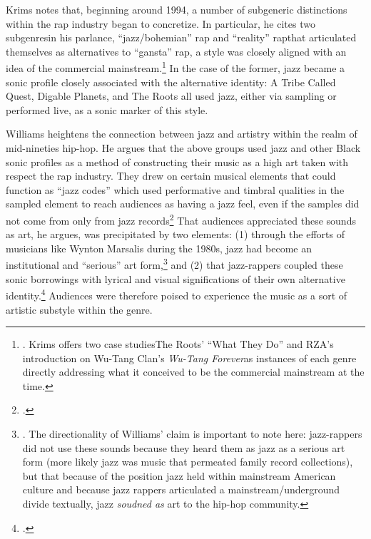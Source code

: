 Krims notes that, beginning around 1994, a number of subgeneric distinctions within the rap industry began to concretize. In
particular, he cites two subgenres\textemdash in his parlance, ``jazz/bohemian'' rap and ``reality'' rap\textemdash that 
articulated themselves as alternatives to ``gansta'' rap, a style was closely aligned with an idea of the commercial 
mainstream.\footnote{
    \autocite[64--65]{adamkrimsRapMusicPoetics2000}. Krims offers two case studies\textemdash The Roots' 
    ``What They Do'' and RZA's introduction on Wu-Tang Clan's \textit{Wu-Tang Forever}\textemdash as 
    instances of each genre directly addressing what it conceived to be the commercial mainstream at
    the time.}
In the case of the former, jazz became a sonic profile closely associated with the alternative identity: A Tribe Called 
Quest, Digable Planets, and The Roots all used jazz, either via sampling or performed live, as a sonic marker of this style.

Williams heightens the connection between jazz and artistry within the realm of mid-nineties hip-hop. He argues that 
the above groups used jazz and other Black sonic profiles as a method of constructing their music as a high art taken
with respect the rap industry. They drew on certain musical elements that could function as ``jazz codes'' which used
performative and timbral qualities in the sampled element to reach audiences as having a jazz feel, even if the samples
did not come from only from jazz records\footnote{
    \autocite[55]{justinawilliamsRhyminStealinMusical2013}.}
That audiences appreciated these sounds as art, he argues, was precipitated by two elements: (1) through the efforts of 
musicians like Wynton Marsalis during the 1980s, jazz had become an institutional and ``serious'' art form,\footnote{
    \autocite[48--52]{justinawilliamsRhyminStealinMusical2013}. The directionality of Williams' claim is important
    to note here: jazz-rappers did not use these sounds because they heard them as jazz as a serious art form (more
    likely jazz was music that permeated family record collections), but that because of the position jazz held within
    mainstream American culture and because jazz rappers articulated a mainstream/underground divide textually, jazz
    \emph{soudned as} art to the hip-hop community.} 
and (2) that jazz-rappers coupled these sonic borrowings with lyrical and visual significations of their own alternative 
identity.\footnote{
    \autocite[55--64]{justinawilliamsRhyminStealinMusical2013}.}
Audiences were therefore poised to experience the music as a sort of artistic substyle within the genre.

